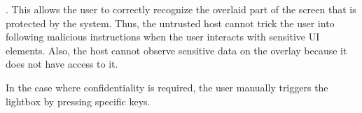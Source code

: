 .  This allows the user to correctly recognize the overlaid part of the screen that is protected by the system. Thus, the untrusted host cannot trick the user into following malicious instructions when the user interacts with sensitive UI elements. Also, the host cannot observe sensitive data on the overlay because it does not have access to it. 

In the case where confidentiality is required, the user manually triggers the lightbox by pressing specific keys. 
